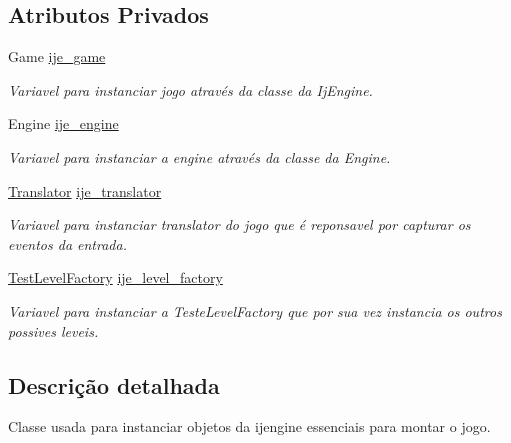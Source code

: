 \subsection*{Atributos Privados}
\begin{DoxyCompactItemize}
\item 
\mbox{\label{classIje02Game_a7f7eadb4d54983aa19a067fa30386ecb}} 
Game \mbox{\hyperlink{classIje02Game_a7f7eadb4d54983aa19a067fa30386ecb}{ije\+\_\+game}}
\begin{DoxyCompactList}\small\item\em Variavel para instanciar jogo através da classe da Ij\+Engine. \end{DoxyCompactList}\item 
\mbox{\label{classIje02Game_ad0d409f32af38af5aee785abd63f9287}} 
Engine \mbox{\hyperlink{classIje02Game_ad0d409f32af38af5aee785abd63f9287}{ije\+\_\+engine}}
\begin{DoxyCompactList}\small\item\em Variavel para instanciar a engine através da classe da Engine. \end{DoxyCompactList}\item 
\mbox{\label{classIje02Game_a7a07e95a79c99ff7900a57df06aedf92}} 
\mbox{\hyperlink{classTranslator}{Translator}} \mbox{\hyperlink{classIje02Game_a7a07e95a79c99ff7900a57df06aedf92}{ije\+\_\+translator}}
\begin{DoxyCompactList}\small\item\em Variavel para instanciar translator do jogo que é reponsavel por capturar os eventos da entrada. \end{DoxyCompactList}\item 
\mbox{\label{classIje02Game_a716ea218d15acad4c3173e74c08df118}} 
\mbox{\hyperlink{classTestLevelFactory}{Test\+Level\+Factory}} \mbox{\hyperlink{classIje02Game_a716ea218d15acad4c3173e74c08df118}{ije\+\_\+level\+\_\+factory}}
\begin{DoxyCompactList}\small\item\em Variavel para instanciar a Teste\+Level\+Factory que por sua vez instancia os outros possives leveis. \end{DoxyCompactList}\end{DoxyCompactItemize}


\subsection{Descrição detalhada}
Classe usada para instanciar objetos da ijengine essenciais para montar o jogo. 

